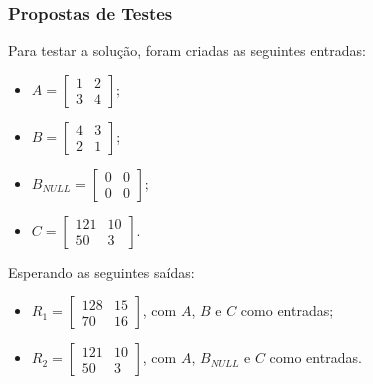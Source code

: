 \documentclass{beamer}
\begin{document}
    \begin{frame}
        \frametitle{Propostas de Testes}

        \begingroup {}
        Para testar a solução, foram criadas as seguintes entradas:

        \begin{itemize}
            \item $ A = \begin{bmatrix} 1 & 2 \\ 3 & 4 \end{bmatrix} $;
            \item $ B = \begin{bmatrix} 4 & 3 \\ 2 & 1 \end{bmatrix} $;
            \item $ B_{NULL} = \begin{bmatrix} 0 & 0 \\ 0 & 0 \end{bmatrix} $;
            \item $ C = \begin{bmatrix} 121 & 10 \\ 50 & 3 \end{bmatrix} $.
        \end{itemize}
        \endgroup

        \begingroup {}
        Esperando as seguintes saídas:
        \begin{itemize} 
            \item $ R_1 = \begin{bmatrix} 128 & 15 \\ 70 & 16 \end{bmatrix} $,
                  com $ A $, $ B $ e $ C $ como entradas;
            \item $ R_2 = \begin{bmatrix} 121 & 10 \\ 50 & 3 \end{bmatrix} $,
                  com $ A $, $ B_{NULL} $ e $ C $ como entradas.
        \end{itemize}
        \endgroup

    \end{frame}
\end{document}
